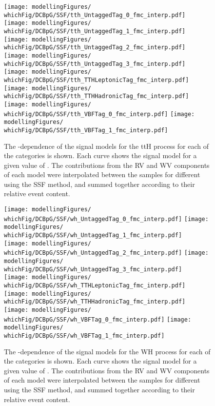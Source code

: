 \begin{figure}[htp!]
\centering
\texttt{[image: modellingFigures/\\whichFig/DCBpG/SSF/tth\_UntaggedTag\_0\_fmc\_interp.pdf]} 
\texttt{[image: modellingFigures/\\whichFig/DCBpG/SSF/tth\_UntaggedTag\_1\_fmc\_interp.pdf]} \\ 
\texttt{[image: modellingFigures/\\whichFig/DCBpG/SSF/tth\_UntaggedTag\_2\_fmc\_interp.pdf]} 
\texttt{[image: modellingFigures/\\whichFig/DCBpG/SSF/tth\_UntaggedTag\_3\_fmc\_interp.pdf]} \\
\texttt{[image: modellingFigures/\\whichFig/DCBpG/SSF/tth\_TTHLeptonicTag\_fmc\_interp.pdf]} 
\texttt{[image: modellingFigures/\\whichFig/DCBpG/SSF/tth\_TTHHadronicTag\_fmc\_interp.pdf]} \\ 
\texttt{[image: modellingFigures/\\whichFig/DCBpG/SSF/tth\_VBFTag\_0\_fmc\_interp.pdf]} 
\texttt{[image: modellingFigures/\\whichFig/DCBpG/SSF/tth\_VBFTag\_1\_fmc\_interp.pdf]} \\
\caption{The \mH-dependence of the signal models for the ttH process for each of the categories is shown. Each curve shows the signal model for a given value of \mH. The contributions from the RV and WV components of each model were interpolated between the samples for different \mH using the SSF method, and summed together according to their relative event content.}

\label{fig:model:sig_interpolation_tth}
\end{figure}

\begin{figure}[htp!]
\centering
\texttt{[image: modellingFigures/\\whichFig/DCBpG/SSF/wh\_UntaggedTag\_0\_fmc\_interp.pdf]} 
\texttt{[image: modellingFigures/\\whichFig/DCBpG/SSF/wh\_UntaggedTag\_1\_fmc\_interp.pdf]} \\ 
\texttt{[image: modellingFigures/\\whichFig/DCBpG/SSF/wh\_UntaggedTag\_2\_fmc\_interp.pdf]} 
\texttt{[image: modellingFigures/\\whichFig/DCBpG/SSF/wh\_UntaggedTag\_3\_fmc\_interp.pdf]} \\
\texttt{[image: modellingFigures/\\whichFig/DCBpG/SSF/wh\_TTHLeptonicTag\_fmc\_interp.pdf]} 
\texttt{[image: modellingFigures/\\whichFig/DCBpG/SSF/wh\_TTHHadronicTag\_fmc\_interp.pdf]} \\ 
\texttt{[image: modellingFigures/\\whichFig/DCBpG/SSF/wh\_VBFTag\_0\_fmc\_interp.pdf]} 
\texttt{[image: modellingFigures/\\whichFig/DCBpG/SSF/wh\_VBFTag\_1\_fmc\_interp.pdf]} \\
\caption{The \mH-dependence of the signal models for the WH process for each of the categories is shown. Each curve shows the signal model for a given value of \mH. The contributions from the RV and WV components of each model were interpolated between the samples for different \mH using the SSF method, and summed together according to their relative event content.}

\label{fig:model:sig_interpolation_wh}
\end{figure}

